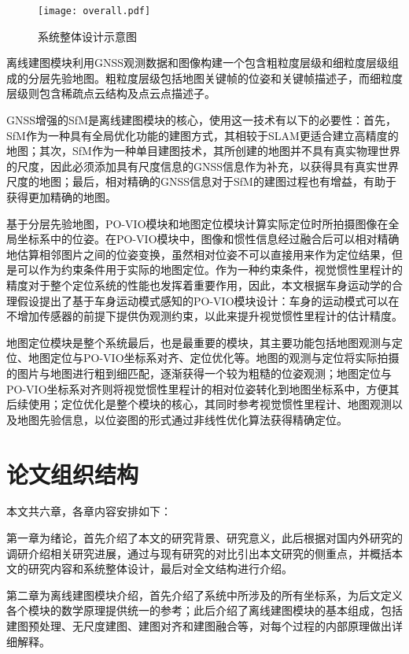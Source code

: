 \begin{figure}
  \centering
  \texttt{[image: overall.pdf]}
  \caption{系统整体设计示意图}
  \label{fig:overall}
\end{figure}

离线建图模块利用GNSS观测数据和图像构建一个包含粗粒度层级和细粒度层级组成的分层先验地图。粗粒度层级包括地图关键帧的位姿和关键帧描述子，而细粒度层级则包含稀疏点云结构及点云点描述子。

GNSS增强的SfM是离线建图模块的核心，使用这一技术有以下的必要性：首先，SfM作为一种具有全局优化功能的建图方式，其相较于SLAM更适合建立高精度的地图；其次，SfM作为一种单目建图技术，其所创建的地图并不具有真实物理世界的尺度，因此必须添加具有尺度信息的GNSS信息作为补充，以获得具有真实世界尺度的地图；最后，相对精确的GNSS信息对于SfM的建图过程也有增益，有助于获得更加精确的地图。

基于分层先验地图，PO-VIO模块和地图定位模块计算实际定位时所拍摄图像在全局坐标系中的位姿。在PO-VIO模块中，图像和惯性信息经过融合后可以相对精确地估算相邻图片之间的位姿变换，虽然相对位姿不可以直接用来作为定位结果，但是可以作为约束条件用于实际的地图定位。作为一种约束条件，视觉惯性里程计的精度对于整个定位系统的性能也发挥着重要作用，因此，本文根据车身运动学的合理假设提出了基于车身运动模式感知的PO-VIO模块设计：车身的运动模式可以在不增加传感器的前提下提供伪观测约束，以此来提升视觉惯性里程计的估计精度。

地图定位模块是整个系统最后，也是最重要的模块，其主要功能包括地图观测与定位、地图定位与PO-VIO坐标系对齐、定位优化等。地图的观测与定位将实际拍摄的图片与地图进行粗到细匹配，逐渐获得一个较为粗糙的位姿观测；地图定位与PO-VIO坐标系对齐则将视觉惯性里程计的相对位姿转化到地图坐标系中，方便其后续使用；定位优化是整个模块的核心，其同时参考视觉惯性里程计、地图观测以及地图先验信息，以位姿图的形式通过非线性优化算法获得精确定位。

\section{论文组织结构}
本文共六章，各章内容安排如下：

第一章为绪论，首先介绍了本文的研究背景、研究意义，此后根据对国内外研究的调研介绍相关研究进展，通过与现有研究的对比引出本文研究的侧重点，并概括本文的研究内容和系统整体设计，最后对全文结构进行介绍。

第二章为离线建图模块介绍，首先介绍了系统中所涉及的所有坐标系，为后文定义各个模块的数学原理提供统一的参考；此后介绍了离线建图模块的基本组成，包括建图预处理、无尺度建图、建图对齐和建图融合等，对每个过程的内部原理做出详细解释。

